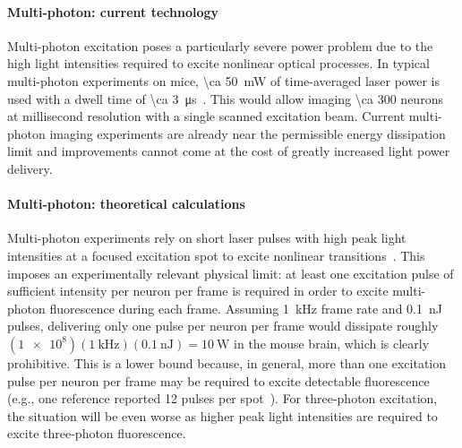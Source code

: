 \paragraph{Multi-photon: current technology}
Multi-photon excitation poses a particularly severe power problem due to the high light intensities required to excite nonlinear optical processes.
In typical multi-photon experiments on mice, \SI{\ca 50}{\milli\watt} of time-averaged laser power is used with a dwell time of \SI{\ca 3}{\micro\second}~\cite{wilson07}.
This would allow imaging \num{\ca 300} neurons at millisecond resolution with a single scanned excitation beam.
Current multi-photon imaging experiments are already near the permissible energy dissipation limit and improvements cannot come at the cost of greatly increased light power delivery.

\paragraph{Multi-photon: theoretical calculations}
Multi-photon experiments rely on short laser pulses with high peak light intensities at a focused excitation spot to excite nonlinear transitions~\cite{kim99}.
This imposes an experimentally relevant physical limit: at least one excitation pulse of sufficient intensity per neuron per frame is required in order to excite multi-photon fluorescence during each frame.
Assuming \SI{1}{\kilo\hertz} frame rate and \SI{0.1}{\nano\joule} pulses, delivering only one pulse per neuron per frame would dissipate roughly $\left(\num{1e8}\right)\left(\SI{1}{\kilo\hertz}\right)\left(\SI{0.1}{\nano\joule}\right)=\SI{10}{\watt}$ in the mouse brain, which is clearly prohibitive.
This is a lower bound because, in general, more than one excitation pulse per neuron per frame may be required to excite detectable fluorescence (e.g., one reference reported 12 pulses per spot~\cite{kim99}).
For three-photon excitation, the situation will be even worse as higher peak light intensities are required to excite three-photon fluorescence.

